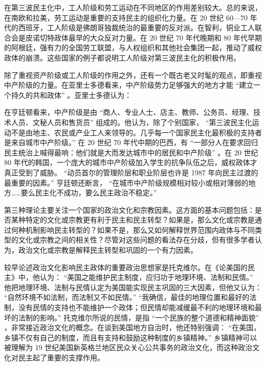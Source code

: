在第三波民主化中，工人阶级和劳工运动在不同地区的作用差别较大。总的来说，在南欧和拉美，劳工运动是重要的支持民主的组织化力量。在 20 世纪 60—70 年代的西班牙，工人阶级是佛朗哥独裁统治的最重要的反对派。在智利，铜业工人联合会是皮诺切特政体最早的大众反对力量。在 20 世纪 70 年代晚期和 80 年代早期的阿根廷，强有力的全国劳工联盟，与人权组织和其他社会集团一起，推动了威权政体的崩溃。这些国家的例子都说明工人阶级对第三波民主化的积极作用。

除了重视资产阶级或工人阶级的作用之外，还有一个既古老又时髦的观点，即重视中产阶级的力量。在亚里士多德看来，中产阶级势力足够强大的地方才能 “建立一个持久的共和政体” 。亚里士多德认为：


在亨廷顿看来，中产阶级是由 “商人、专业人士、店主、教师、公务员、经理、技术人员、文秘人员和售货员” 组成的。他认为，除了个别国家， “第三波民主化运动不是由地主、农民或产业工人来领导的。几乎每一个国家民主化最积极的支持者是来自城市中产阶级。” 在 20 世纪 70 年代中期的巴西，有 “一部分人在要求回归民主统治上喊得最响：他们就是大而发达城市中的居民和中产阶级” 。在 20 世纪 80 年代的韩国，一个庞大的城市中产阶级加入学生的抗争队伍之后，威权政体才真正受到了威胁。 “动员首尔的管理阶层和职业阶层也许是 1987 年向民主过渡的最重要的因素。” 亨廷顿还断言， “在城市中产阶级规模相对较小或相对薄弱的地方……要么民主化不成功，要么民主政治不稳定。” 


第三种理论主要关注一个国家的政治文化和宗教因素。这方面的基本问题包括：是否某种特定的文化或宗教更有利于民主和民主转型？如果是，那么文化或宗教是通过何种机制影响民主转型的？如果不是，那么又如何解释世界范围内政体与不同类型的文化或宗教之间的相关性？尽管对这些问题的看法存在分歧，但有很多学者认为，政治文化或宗教是解释民主转型和巩固的一个有力因素。

较早论述政治文化影响民主政体的重要政治思想家是托克维尔。在《论美国的民主》中，他认为： “美国之能维护民主制度，应归功于地理环境、法制和民情。” 他把地理环境、法制与民情认定为美国能实现民主巩固的三大因素，但他又认为： “自然环境不如法制，而法制又不如民情。”  “我确信，最佳的地理位置和最好的法制，没有民情的支持也不能维护一个政体；但民情却能减缓最不利的地理环境和最坏的法制的影响。” 托克维尔所说的民情，是指 “一个民族的整个道德和精神面貌” ，非常接近政治文化的概念。在谈到美国地方自治时，他还特别强调： “在美国，乡镇不仅有自己的制度，而且有支持和鼓励这种制度的乡镇精神。” 乡镇精神可以被理解为 19 世纪美国新英格兰地区民众关心公共事务的政治文化，而这种政治文化对民主起了重要的支撑作用。

